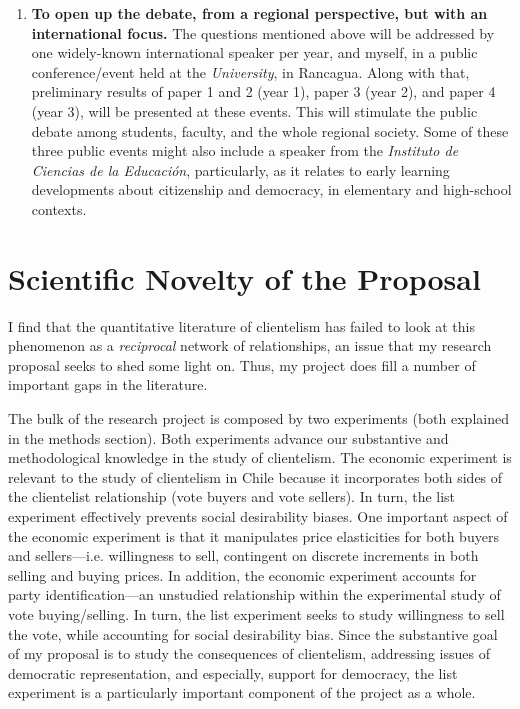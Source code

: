 \documentclass[onesided]{article}\usepackage[]{graphicx}\usepackage[]{color}
\begin{document}
\begin{enumerate}
	\item {\bf To open up the debate, from a regional perspective, but with an international focus.} The questions mentioned above will be addressed by one widely-known international speaker per year, and myself, in a public conference/event held at the \emph{University}, in Rancagua. Along with that, preliminary results of paper 1 and 2 (year 1), paper 3 (year 2), and paper 4 (year 3), will be presented at these events. This will stimulate the public debate among students, faculty, and the whole regional society. Some of these three public events might also include a speaker from the \emph{Instituto de Ciencias de la Educaci\'on}, particularly, as it relates to early learning developments about citizenship and democracy, in elementary and high-school contexts.
\end{enumerate}

\section{Scientific Novelty of the Proposal}


I find that the quantitative literature of clientelism has failed to look at this phenomenon as a \emph{reciprocal} network of relationships, an issue that my research proposal seeks to shed some light on. Thus, my project does fill a number of important gaps in the literature. 


The bulk of the research project is composed by two experiments (both explained in the methods section). Both experiments advance our substantive and methodological knowledge in the study of clientelism. The economic experiment is relevant to the study of clientelism in Chile because it incorporates both sides of the clientelist relationship (vote buyers and vote sellers). In turn, the list experiment effectively prevents social desirability biases. One important aspect of the economic experiment is that it manipulates price elasticities for both buyers and sellers---i.e. willingness to sell, contingent on discrete increments in both selling and buying prices. In addition, the economic experiment accounts for party identification---an unstudied relationship within the experimental study of vote buying/selling. In turn, the list experiment seeks to study willingness to sell the vote, while accounting for social desirability bias. Since the substantive goal of my proposal is to study the consequences of clientelism, addressing issues of democratic representation, and especially, support for democracy, the list experiment is a particularly important component of the project as a whole.
\end{document}
